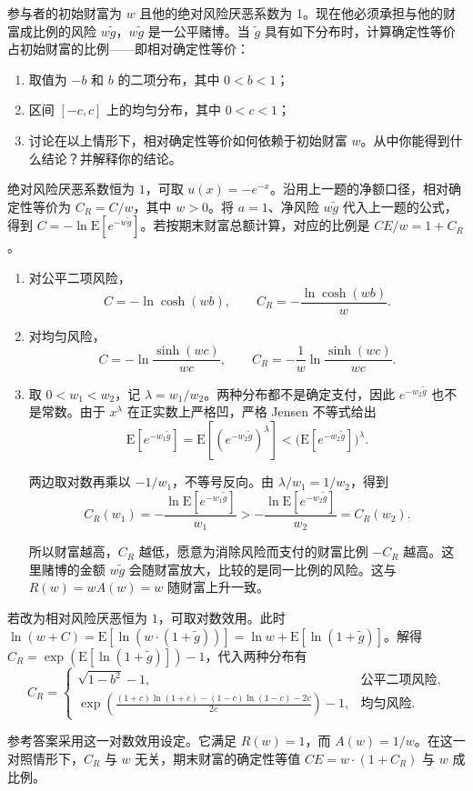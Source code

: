 \begin{problem}
 参与者的初始财富为 $w$ 且他的绝对风险厌恶系数为 1。现在他必须承担与他的财富成比例的风险 $w\tilde{g}$，$w\tilde{g}$ 是一公平赌博。当 $\tilde{g}$ 具有如下分布时，计算确定性等价占初始财富的比例——即相对确定性等价：
\begin{enumerate}[label=(\alph*)]
    \item 取值为 $-b$ 和 $b$ 的二项分布，其中 $0<b<1$；
    \item 区间 $[-c,c]$ 上的均匀分布，其中 $0<c<1$；
    \item 讨论在以上情形下，相对确定性等价如何依赖于初始财富 $w$。从中你能得到什么结论？并解释你的结论。
\end{enumerate}

\end{problem}
\begin{solution}[blank-type=manual,blank-vsep=9\baselineskip]
绝对风险厌恶系数恒为 $1$，可取 $u(x)=-e^{-x}$。沿用上一题的净额口径，相对确定性等价为 $C_R=C/w$，其中 $w>0$。将 $a=1$、净风险 $w\tilde g$ 代入上一题的公式，得到 $C=-\ln\mathrm E[e^{-w\tilde g}]$。若按期末财富总额计算，对应的比例是 $CE/w=1+C_R$。
\begin{enumerate}[label=(\alph*)]
\item 对公平二项风险，
\[
 C=-\ln\cosh(wb),\qquad
 C_R=-\frac{\ln\cosh(wb)}{w}.
\]
\item 对均匀风险，
\[
 C=-\ln\frac{\sinh(wc)}{wc},\qquad
 C_R=-\frac1w\ln\frac{\sinh(wc)}{wc}.
\]
\item 取 $0<w_1<w_2$，记 $\lambda=w_1/w_2$。两种分布都不是确定支付，因此 $e^{-w_2\tilde g}$ 也不是常数。由于 $x^\lambda$ 在正实数上严格凹，严格 Jensen 不等式给出
\[
 \mathrm E[e^{-w_1\tilde g}]
 =\mathrm E\!\left[(e^{-w_2\tilde g})^\lambda\right]
 <\bigl(\mathrm E[e^{-w_2\tilde g}]\bigr)^\lambda.
\]

两边取对数再乘以 $-1/w_1$，不等号反向。由 $\lambda/w_1=1/w_2$，得到
\[
 C_R(w_1)=-\frac{\ln\mathrm E[e^{-w_1\tilde g}]}{w_1}
 >-\frac{\ln\mathrm E[e^{-w_2\tilde g}]}{w_2}=C_R(w_2).
\]

所以财富越高，$C_R$ 越低，愿意为消除风险而支付的财富比例 $-C_R$ 越高。这里赌博的金额 $w\tilde g$ 会随财富放大，比较的是同一比例的风险。这与 $R(w)=wA(w)=w$ 随财富上升一致。
\end{enumerate}

若改为相对风险厌恶恒为 $1$，可取对数效用。此时 $\ln(w+C)=\mathrm E[\ln(w\cdot(1+\tilde g))]=\ln w+\mathrm E[\ln(1+\tilde g)]$。解得 $C_R=\exp(\mathrm E[\ln(1+\tilde g)])-1$，代入两种分布有
\[
 C_R=
 \begin{cases}
  \sqrt{1-b^2}-1,&\text{公平二项风险},\\[3pt]
  \displaystyle\exp\!\left(
  \frac{(1+c)\ln(1+c)-(1-c)\ln(1-c)-2c}{2c}\right)-1,
  &\text{均匀风险}.
 \end{cases}
\]

参考答案采用这一对数效用设定。它满足 $R(w)=1$，而 $A(w)=1/w$。在这一对照情形下，$C_R$ 与 $w$ 无关，期末财富的确定性等值 $CE=w\cdot(1+C_R)$ 与 $w$ 成比例。
\end{solution}

